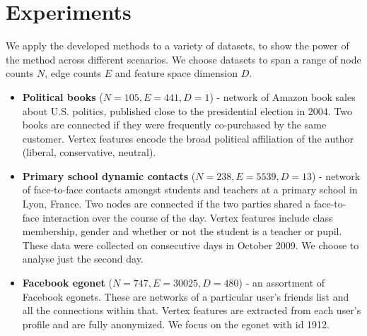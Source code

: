 \section{Experiments}

We apply the developed methods to a variety of datasets, to show the power of the method across different scenarios. We choose datasets to span a range of node counts $N$, edge counts $E$ and feature space dimension $D$.

\begin{itemize}
	\item \textbf{Political books} \cite{polbooks} ($N=105, E=441, D=1$) - network of Amazon book sales about U.S. politics, published close to the presidential election in 2004. Two books are connected if they were frequently co-purchased by the same customer. Vertex features encode the broad political affiliation of the author (liberal, conservative, neutral).
		
	\item \textbf{Primary school dynamic contacts} \cite{schools} ($N=238, E=5539, D=13$) - network of face-to-face contacts amongst students and teachers at a primary school in Lyon, France. Two nodes are connected if the two parties shared a face-to-face interaction over the course of the day. Vertex features include class membership, gender and whether or not the student is a teacher or pupil. These data were collected on consecutive days in October 2009. We choose to analyse just the second day.
	
	\item \textbf{Facebook egonet} \cite{fb-snap} ($N=747, E=30025, D=480$) - an assortment of Facebook egonets. These are networks of a particular user's friends list and all the connections within that. Vertex features are extracted from each user's profile and are fully anonymized. We focus on the egonet with id 1912.
	
%		
%	

\end{itemize}

